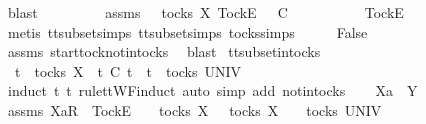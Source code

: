 \begin{isabellebody}
\ blast\isanewline
{}\isamarkupfalse%
\isanewline
\ \ \isamarkupfalse%
\ {\isasymrho}\ {\isasymsigma}\isanewline
\ \ \isamarkupfalse%
\ assms{\isacharcolon}\ {\isachardoublequoteopen}{\isasymsigma}\ {\isasymin}\ tocks\ X{\isachardoublequoteclose}\ {\isachardoublequoteopen}{\isacharbrackleft}Tock{\isacharbrackright}\isactrlsub E\ {\isacharhash}\ {\isasymrho}\ {\isasymsubseteq}\isactrlsub C\ {\isasymsigma}{\isachardoublequoteclose}\isanewline
\ \ \isamarkupfalse%
\ \isamarkupfalse%
\ {\isasymsigma}{\isacharprime}\ \ {\isachardoublequoteopen}{\isasymsigma}\ {\isacharequal}\ {\isacharbrackleft}Tock{\isacharbrackright}\isactrlsub E\ {\isacharhash}\ {\isasymsigma}{\isacharprime}{\isachardoublequoteclose}\isanewline
\ \ \ \ \isamarkupfalse%
\ {\isacharparenleft}metis\ tt{\isacharunderscore}subset{\isachardot}simps{\isacharparenleft}{}{\isacharparenright}\ tt{\isacharunderscore}subset{\isachardot}simps{\isacharparenleft}{}{\isacharparenright}\ tocks{\isachardot}simps{\isacharparenright}\isanewline
\ \ \isamarkupfalse%
\ \isamarkupfalse%
\ False\isanewline
\ \ \ \ \isamarkupfalse%
\ assms{\isacharparenleft}{}{\isacharparenright}\ start{\isacharunderscore}tock{\isacharunderscore}notin{\isacharunderscore}tocks\ \isamarkupfalse%
\ blast\isanewline
{}\isamarkupfalse%
%
\endisatagproof
{\isafoldproof}%
%
\isadelimproof
\isanewline
%
\endisadelimproof
\isanewline
{}\isamarkupfalse%
\ tt{\isacharunderscore}subset{\isacharunderscore}in{\isacharunderscore}tocks{}{\isacharcolon}\isanewline
\ \ {\isachardoublequoteopen}t\ {\isasymin}\ tocks\ X\ {\isasymLongrightarrow}\ t\ {\isasymsubseteq}\isactrlsub C\ t{\isacharprime}\ {\isasymLongrightarrow}\ t{\isacharprime}\ {\isasymin}\ tocks\ UNIV{\isachardoublequoteclose}\isanewline
%
\isadelimproof
%
\endisadelimproof
%
\isatagproof
{}\isamarkupfalse%
\ {\isacharparenleft}induct\ t\ t{\isacharprime}\ rule{\isacharcolon}ttWF{}{\isachardot}induct{\isacharcomma}\ auto\ simp\ add{\isacharcolon}\ notin{\isacharunderscore}tocks{\isacharparenright}\isanewline
\ \ \isamarkupfalse%
\ Xa\ {\isasymrho}\ Y\ {\isasymsigma}\isanewline
\ \ \isamarkupfalse%
\ assms{\isacharcolon}\ {\isachardoublequoteopen}{\isacharbrackleft}Xa{\isacharbrackright}\isactrlsub R\ {\isacharhash}\ {\isacharbrackleft}Tock{\isacharbrackright}\isactrlsub E\ {\isacharhash}\ {\isasymrho}\ {\isasymin}\ tocks\ X{\isachardoublequoteclose}\ {\isachardoublequoteopen}{\isasymrho}\ {\isasymin}\ tocks\ X\ {\isasymLongrightarrow}\ {\isasymsigma}\ {\isasymin}\ tocks\ UNIV{\isachardoublequoteclose}\isanewline

\end{isabellebody}
